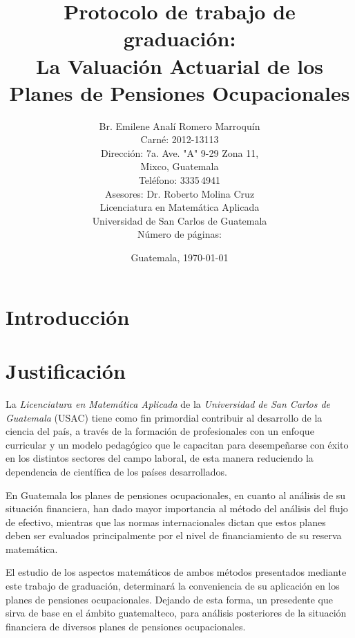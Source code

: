 \documentclass[12pt,letterpaper,titlepage]{article}
\title{Protocolo de trabajo de graduación:\\
La Valuación Actuarial de los Planes de Pensiones Ocupacionales}
\author{Br. Emilene Analí Romero Marroquín\\Carné: 2012-13113\\Dirección: 7a. Ave. "A" 9-29 Zona 11,\\Mixco, Guatemala\\Teléfono: 3335\,4941\\Asesores: Dr. Roberto Molina Cruz\\Licenciatura en Matemática Aplicada\\Universidad de San Carlos de Guatemala\\Número de páginas: \pageref{fin}}
\date{Guatemala, \today}
\begin{document}
\begin{titlepage}
\renewcommand{\thepage}{}
\pagestyle{empty}
\maketitle
\end{titlepage}\newpage
\setcounter{page}{2}
\tableofcontents
\newpage
\nocite{*}
\section{Introducción}





\newpage

\section{Justificación}

La \textit{Licenciatura en Matemática Aplicada} de la \textit{Universidad de San Carlos de Guatemala} (USAC) tiene como fin primordial contribuir al desarrollo de la ciencia del país, a través de la formación de profesionales con un enfoque curricular y un modelo pedagógico que le capacitan para desempeñarse con éxito en los distintos sectores del campo laboral, de esta manera reduciendo la dependencia de científica de los países desarrollados.\bigskip

En Guatemala los planes de pensiones ocupacionales, en cuanto al análisis de su situación financiera, han dado mayor importancia al método del análisis del flujo de efectivo, mientras que las normas internacionales dictan que estos planes deben ser evaluados principalmente por el nivel de financiamiento de su reserva matemática.  \bigskip

El estudio de los aspectos matemáticos de ambos métodos presentados mediante este trabajo de graduación, determinará la conveniencia de su aplicación en los planes de pensiones ocupacionales. Dejando de esta forma, un presedente que sirva de base en el ámbito guatemalteco, para análisis posteriores de la situación financiera de diversos planes de pensiones ocupacionales.



\newpage
\end{document}
